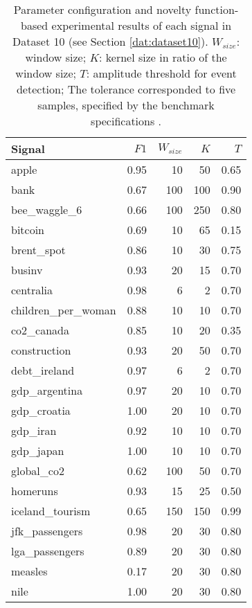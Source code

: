 \begin{table}[H]
\centering
    \caption{Parameter configuration and novelty function-based experimental results of each signal in Dataset 10 (see Section \ref{dat:dataset10}). $W_{size}$: window size; $K$: kernel size in ratio of the window size; $T$: amplitude threshold for event detection; The tolerance corresponded to five samples, specified by the benchmark specifications \cite{cpd_alan}.}
    \label{tab:params_results_alanT}
    \begin{tabular}{lrrrr}
    \toprule
    Signal &     $F1$ &    $W_{size}$ &    $K$ &     $T$\\
    \midrule
    apple &  0.95 &   10 &   50 &  0.65 \\
    bank &  0.67 &  100 &  100 &  0.90 \\
    bee\_waggle\_6 &  0.66 &  100 &  250 &  0.80 \\
    bitcoin &  0.69 &   10 &   65 &  0.15 \\
    brent\_spot &  0.86 &   10 &   30 &  0.75 \\
    businv &  0.93 &   20 &   15 &  0.70 \\
    centralia &  0.98 &    6 &    2 &  0.70 \\
    children\_per\_woman &  0.88 &   10 &   10 &  0.70 \\
    co2\_canada &  0.85 &   10 &   20 &  0.35 \\
    construction &  0.93 &   20 &   50 &  0.70 \\
    debt\_ireland &  0.97 &    6 &    2 &  0.70 \\
    gdp\_argentina &  0.97 &   20 &   10 &  0.70 \\
    gdp\_croatia &  1.00 &   20 &   10 &  0.70 \\
    gdp\_iran &  0.92 &   10 &   10 &  0.70 \\
    gdp\_japan &  1.00 &   10 &   10 &  0.70 \\
    global\_co2 &  0.62 &  100 &   50 &  0.70 \\
    homeruns &  0.93 &   15 &   25 &  0.50 \\
    iceland\_tourism &  0.65 &  150 &  150 &  0.99 \\
    jfk\_passengers &  0.98 &   20 &   30 &  0.80 \\
    lga\_passengers &  0.89 &   20 &   30 &  0.80 \\
    measles &  0.17 &   20 &   30 &  0.80 \\
    nile &  1.00 &   20 &   30 &  0.80 \\

\end{tabular}
\end{table}
